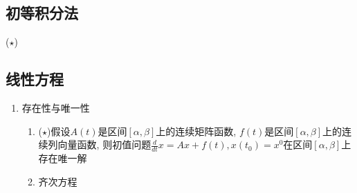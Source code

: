 \subsection{初等积分法}
($\star$)
\subsection{线性方程}
\begin{enumerate}
    \item 存在性与唯一性
    \begin{enumerate}
        \item ($\star$)假设$A(t)$是区间$[\alpha, \beta]$上的连续矩阵函数, $f(t)$是区间$[\alpha, \beta]$上的连续列向量函数, 
        则初值问题$\frac{d}{dt}x=Ax+f(t), x(t_0)=x^0$在区间$[\alpha, \beta]$上存在唯一解
        \item 齐次方程
    \end{enumerate}
\end{enumerate}
